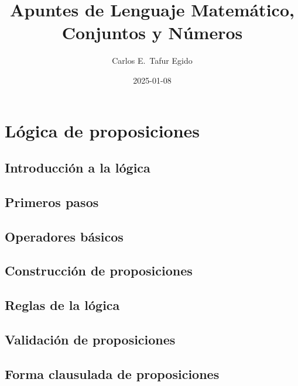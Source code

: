 \documentclass[10pt]{book}
\title{Apuntes de Lenguaje Matemático, Conjuntos y Números}
\author{Carlos E.~Tafur Egido}
\date{2025-01-08}
\begin{document}
\maketitle
\tableofcontents







\chapter{Lógica de proposiciones}%
\label{ch:logica-prop}


  \section{Introducción a la lógica}
  


  \section{Primeros pasos}
  


  \section{Operadores básicos}
  


  \section{Construcción de proposiciones}
  


  \section{Reglas de la lógica}
  


  \section{Validación de proposiciones}
  


  \section{Forma clausulada de proposiciones}
  
\end{document}
